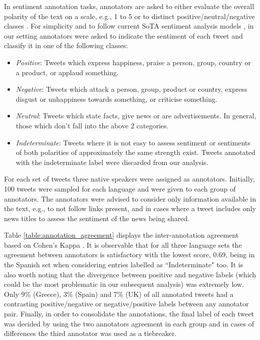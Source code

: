 In sentiment annotation tasks, annotators are asked to either evaluate the overall polarity of the text on a scale, e.g., 1 to 5 \cite{al2017arasenti} or to distinct positive/neutral/negative classes \cite{patwa2020semeval}. For simplicity and to follow current \ac{SoTA} sentiment analysis models \cite{bertweet,barbieri2021xlm}, in our setting annotators were asked to indicate the sentiment of each tweet and classify it in one of the following classes:
\begin{itemize}
    \item \textit{Positive}: Tweets which express happiness, praise a person, group, country or a product, or applaud something.
    \item \textit{Negative}: Tweets which attack a person, group, product or country, express disgust or unhappiness towards something, or criticise something.
    \item \textit{Neutral}: Tweets which state facts, give news or are advertisements. In general, those which don't fall into the above 2 categories.
    \item \textit{Indeterminate}: Tweets where it is not easy to assess sentiment or sentiments of both polarities of approximately the same strength exist. Tweets annotated with the indeterminate label were discarded from our analysis.
\end{itemize}


For each set of tweets three native speakers were assigned as annotators. Initially, 100 tweets were sampled for each language and were given to each group of annotators. The annotators were advised to consider only information available in the text, e.g., to not follow links present, and in cases where a tweet includes only news titles to assess the sentiment of the news being shared.

Table \ref{table:annotation_agreement} displays the  inter-annotation agreement based on Cohen's Kappa \cite{cohen1960coefficient}. It is observable that for all three language sets the agreement between annotators is satisfactory with the lowest score, 0.69, being in the Spanish set when considering entries labelled as ``Indeterminate" too. It is also worth noting that the divergence between positive and negative labels (which could be the most problematic in our subsequent analysis) was extremely low. Only 9\% (Greece), 3\% (Spain) and 7\% (UK) of all annotated tweets had a contrasting positive/negative or negative/positive labels between any annotator pair. Finally, in order to consolidate the annotations, the final label of each tweet was decided by using the two annotators agreement in each group and in cases of differences the third annotator was used as a tiebreaker. 

